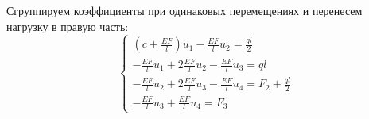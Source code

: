 Сгруппируем коэффициенты при одинаковых перемещениях и перенесем нагрузку в правую часть:
\begin{equation}
    \label{eq6.7}
    \begin{cases}
        \displaystyle (c + \frac{EF}{l}) u_1 - \frac{EF}{l} u_2 = \frac{ql}{2}
        \\[10pt]
        \displaystyle - \frac{EF}{l} u_1 + 2 \frac{EF}{l} u_2 - \frac{EF}{l} u_3 = ql
        \\[10pt]
        \displaystyle - \frac{EF}{l} u_2 + 2 \frac{EF}{l} u_3 - \frac{EF}{l} u_4 = F_2 + \frac{ql}{2}
        \\[10pt]
        \displaystyle - \frac{EF}{l} u_3 + \frac{EF}{l} u_4 = F_3
    \end{cases}
\end{equation}

